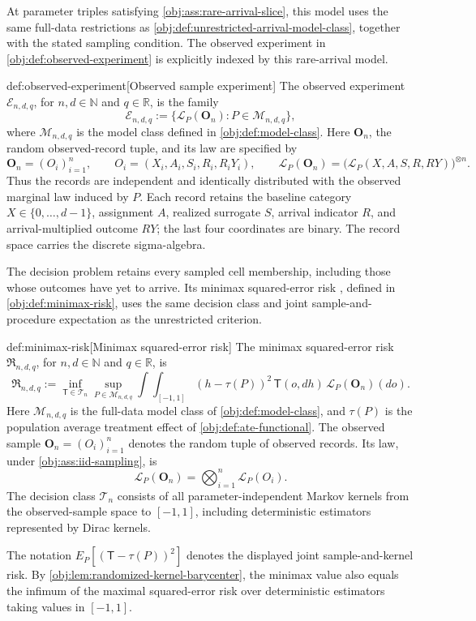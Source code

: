 At parameter triples satisfying \cref{obj:ass:rare-arrival-slice}, this model uses the same full-data restrictions as \cref{obj:def:unrestricted-arrival-model-class}, together with the stated sampling condition. The observed experiment  in \cref{obj:def:observed-experiment} is explicitly indexed by this rare-arrival model.

\begin{definitionv}{def:observed-experiment}[Observed sample experiment]
The observed experiment \(\mathcal E_{n,d,q}\), for \(n,d\in\mathbb N\) and \(q\in\mathbb R\), is the family
\[
\mathcal E_{n,d,q}
:=
\bigl\{\mathcal L_P(\mathbf O_n):P\in\mathcal M_{n,d,q}\bigr\},
\]
where \(\mathcal M_{n,d,q}\) is the model class defined in \cref{obj:def:model-class}. Here \(\mathbf O_n\), the random observed-record tuple, and its law are specified by
\[
\mathbf O_n=(O_i)_{i=1}^{n},
\qquad
O_i=(X_i,A_i,S_i,R_i,R_iY_i),
\qquad
\mathcal L_P(\mathbf O_n)
=
\bigl(\mathcal L_P(X,A,S,R,RY)\bigr)^{\otimes n}.
\]
Thus the records are independent and identically distributed with the observed marginal law induced by \(P\). Each record retains the baseline category \(X\in\{0,\ldots,d-1\}\), assignment \(A\), realized surrogate \(S\), arrival indicator \(R\), and arrival-multiplied outcome \(RY\); the last four coordinates are binary. The record space carries the discrete sigma-algebra.
\end{definitionv}

The decision problem retains every sampled cell membership, including those whose outcomes have yet to arrive. Its minimax squared-error risk , defined in \cref{obj:def:minimax-risk}, uses the same decision class and joint sample-and-procedure expectation as the unrestricted criterion.

\begin{definitionv}{def:minimax-risk}[Minimax squared-error risk]
The minimax squared-error risk \(\mathfrak R_{n,d,q}\), for \(n,d\in\mathbb N\) and \(q\in\mathbb R\), is
\[
\mathfrak R_{n,d,q}
:=
\inf_{\mathsf T\in\mathcal T_n}
\sup_{P\in\mathcal M_{n,d,q}}
\int\!\int_{[-1,1]}
(h-\tau(P))^2\,
\mathsf T(o,dh)\,
\mathcal L_P(\mathbf O_n)(do).
\]
Here \(\mathcal M_{n,d,q}\) is the full-data model class of \cref{obj:def:model-class}, and \(\tau(P)\) is the population average treatment effect of \cref{obj:def:ate-functional}. The observed sample \(\mathbf O_n=(O_i)_{i=1}^n\) denotes the random tuple of observed records. Its law, under \cref{obj:ass:iid-sampling}, is
\[
\mathcal L_P(\mathbf O_n)
=
\bigotimes_{i=1}^{n}\mathcal L_P(O_i).
\]
The decision class \(\mathcal T_n\) consists of all parameter-independent Markov kernels from the observed-sample space to \([-1,1]\), including deterministic estimators represented by Dirac kernels.

The notation \(E_P[(\mathsf T-\tau(P))^2]\) denotes the displayed joint sample-and-kernel risk. By \cref{obj:lem:randomized-kernel-barycenter}, the minimax value also equals the infimum of the maximal squared-error risk over deterministic estimators taking values in \([-1,1]\).
\end{definitionv}


